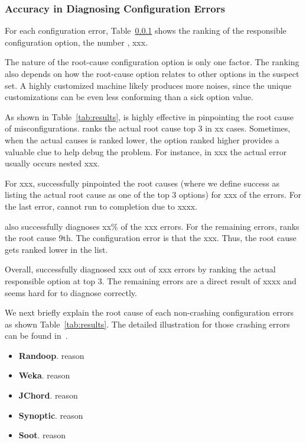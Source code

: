 \subsubsection{Accuracy in Diagnosing Configuration Errors}

For each configuration error, Table~\ref{} shows the ranking of the
responsible configuration option, the number , xxx.

The nature of the root-cause configuration option is only one factor.
The ranking also depends on how the root-cause option relates to
other options in the suspect set. A highly customized machine
likely produces more noises, since the unique customizations
can be even less conforming than a sick option value.

As shown in Table~\ref{tab:results}, \ourtool is highly effective
in pinpointing the root cause of misconfigurations. \ourtool
ranks the actual root cause top 3 in xx cases. Sometimes,
when the actual causes is ranked lower, the option ranked
higher provides a valuable clue to help debug the problem.
For instance, in xxx the actual error usually occurs nested xxx.

For xxx, \ourtool successfully pinpointed the root causes (where
we define success as listing the actual root cause as one of the
top 3 options) for xxx of the errors. For the last error, \ourtool
cannot run to completion due to xxxx.

\ourtool also successfully diagnoses xx\% of the xxx errors. For the
remaining errors, \ourtool ranks the root cause 9th. The configuration
error is that the xxx. Thus, the root cause gets ranked lower
in the list.

Overall, \ourtool successfully diagnosed xxx out of xxx errors
by ranking the actual responsible option at top 3.
The remaining errors are a direct result of xxxx and seems
hard for \ourtool to diagnose correctly.


We next briefly explain the root cause of each non-crashing configuration
errors as shown Table~\ref{tab:results}. The detailed illustration
for those crashing errors can be found in~\cite{Rabkin:2011:PPC}.

\begin{itemize}
\item \textbf{Randoop}. reason
\item \textbf{Weka}. reason
\item \textbf{JChord}. reason
\item \textbf{Synoptic}. reason
\item \textbf{Soot}. reason
\end{itemize}



